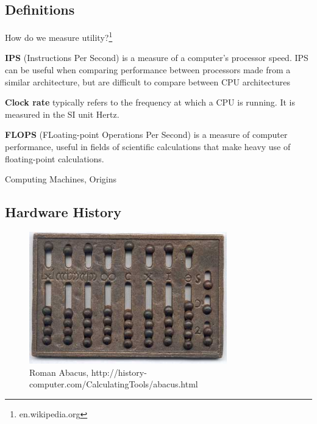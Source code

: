 \documentclass[xcolor=x11names,compress]{beamer}
\renewcommand{\(}{\begin{columns}}
\renewcommand{\)}{\end{columns}}
\newcommand{\<}[1]{\begin{column}{#1}}
\renewcommand{\>}{\end{column}}
\begin{document}
\subsection{Definitions}
\begin{frame}{How do we measure utility?\footnote{en.wikipedia.org}}

\textbf{IPS} (Instructions Per Second) is a measure of a computer's processor speed. IPS can be useful when comparing performance between processors made from a similar architecture, but are difficult to compare between CPU architectures

\vspace*{1 em}
\textbf{Clock rate} typically refers to the frequency at which a CPU is running. It is measured in the SI unit Hertz.

\vspace*{1 em}
\textbf{FLOPS} (FLoating-point Operations Per Second) is a measure of computer performance, useful in fields of scientific calculations that make heavy use of floating-point calculations. 
\end{frame}

\begin{frame}{Computing Machines, Origins}
\subsection{Hardware History}
\begin{figure}
\includegraphics[height=2.25in,clip]{RomanAbacus}
\caption{Roman Abacus, http://history-computer.com/CalculatingTools/abacus.html}
\end{figure}

\end{frame}
\end{document}
